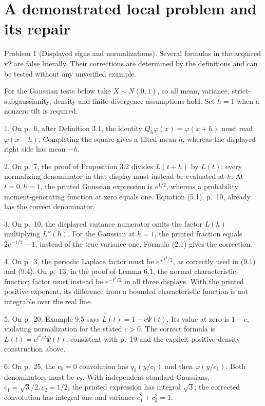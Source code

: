 \documentclass[10pt]{article}
\begin{document}
\section*{A demonstrated local problem and its repair}
Problem 1 (Displayed signs and normalizations).  Several formulas in the acquired v2 are false literally. Their corrections are determined by the definitions and can be tested without any unverified example.\par
For the Gaussian tests below take \(X\sim N(0,1)\), so all mean, variance, strict-subgaussianity, density and finite-divergence assumptions hold. Set \(h=1\) when a nonzero tilt is required.\par
1. On p. 6, after Definition 3.1, the identity \(Q_h\varphi(x)=\varphi(x+h)\) must read \(\varphi(x-h)\). Completing the square gives a tilted mean \(h\), whereas the displayed right side has mean \(-h\).\par
2. On p. 7, the proof of Proposition 3.2 divides \(L(t+h)\) by \(L(t)\); every normalizing denominator in that display must instead be evaluated at \(h\). At \(t=0,h=1\), the printed Gaussian expression is \(e^{1/2}\), whereas a probability moment-generating function at zero equals one. Equation (5.1), p. 10, already has the correct denominator.\par
3. On p. 10, the displayed variance numerator omits the factor \(L(h)\) multiplying \(L''(h)\). For the Gaussian at \(h=1\), the printed fraction equals \(2e^{-1/2}-1\), instead of the true variance one. Formula (2.1) gives the correction.\par
4. On p. 3, the periodic Laplace factor must be \(e^{+t^2/2}\), as correctly used in (9.1) and (9.4). On p. 13, in the proof of Lemma 6.1, the normal characteristic-function factor must instead be \(e^{-t^2/2}\) in all three displays. With the printed positive exponent, its difference from a bounded characteristic function is not integrable over the real line.\par
5. On p. 20, Example 9.5 says \(L(t)=1-c\Psi(t)\). Its value at zero is \(1-c\), violating normalization for the stated \(c>0\). The correct formula is \(L(t)=e^{t^2/2}\Psi(t)\), consistent with p. 19 and the explicit positive-density construction above.\par
6. On p. 25, the \(c_0=0\) convolution has \(q_2(y/c_1)\) and then \(\varphi(y/c_1)\). Both denominators must be \(c_2\). With independent standard Gaussians, \(c_1=\sqrt3/2,c_2=1/2\), the printed expression has integral \(\sqrt3\); the corrected convolution has integral one and variance \(c_1^2+c_2^2=1\).\par
\end{document}
